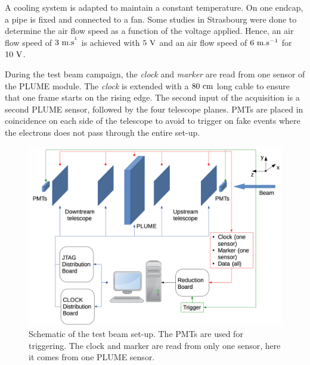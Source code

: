      A cooling system is adapted to maintain a constant temperature. 
      On one endcap, a pipe is fixed and connected to a fan.
      Some studies in Strasbourg were done to determine the air flow speed as a function of the voltage applied.
      Hence, an air flow speed of $3~\rm{m.s^{^1}}$ is achieved with $5~\rm{V}$ and an air flow speed of $6~\rm{m.s^{-1}}$ for $10~\rm{V}$.

      During the test beam campaign, the \textit{clock} and \textit{marker} are read from one sensor of the \gls{PLUME} module.
      The \textit{clock} is extended with a $80~\rm{cm}$ long cable to ensure that one frame starts on the rising edge.
      The second input of the acquisition is a second \gls{PLUME} sensor, followed by the four telescope planes. 
      \gls{PMT}s are placed in coincidence on each side of the telescope to avoid to trigger on fake events where the electrons does not pass through the entire set-up.


    \begin{figure}
      \centering
      \includegraphics[width = \textwidth]{Pictures/X0/testBeamAcquisition.png}
      \caption{Schematic of the test beam set-up. The PMTs are used for triggering. The clock and marker are read from only one sensor, here it comes from one PLUME sensor.}
      \label{fig:testBeamAcq}
    \end{figure}

